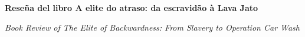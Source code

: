 
\renewcommand{\articuloidiomaxml}{es}
\renewcommand{\articulotitulo}{Reseña del libro A elite do atraso: da escravidão à Lava Jato}
\renewcommand{\articuloautores}{Thiago Almeida Costa}
\renewcommand{\articulodoi}{10.22296/2317-1529.2018v20n3p591}
\renewcommand{\articulotipo}{RESEÑA}
\renewcommand{\articulorevista}{Conexiones: Revista Latinoamericana de Sociedad y Tecnología}
\renewcommand{\articuloissne}{0327-7712}
\renewcommand{\articulovolumen}{01}
\renewcommand{\articulonumero}{01}
\renewcommand{\articulofecha}{ 2026}

\setcounter{page}{1}
\thispagestyle{firstpage}

\noindent\begin{minipage}[t]{\dimexpr\textwidth+\marginparsep+\marginparwidth\relax}%
{\sffamily\bfseries\Large\articulotitulo\par}%
\end{minipage}\par
\vspace{3mm}%
\renewcommand{\articulotitulotrans}{Book Review of The Elite of Backwardness: From Slavery to Operation Car Wash}
\noindent\begin{minipage}[t]{\dimexpr\textwidth+\marginparsep+\marginparwidth\relax}%
{\sffamily\itshape\normalsize\articulotitulotrans\par}%
\end{minipage}\par
\vspace{4mm}%

